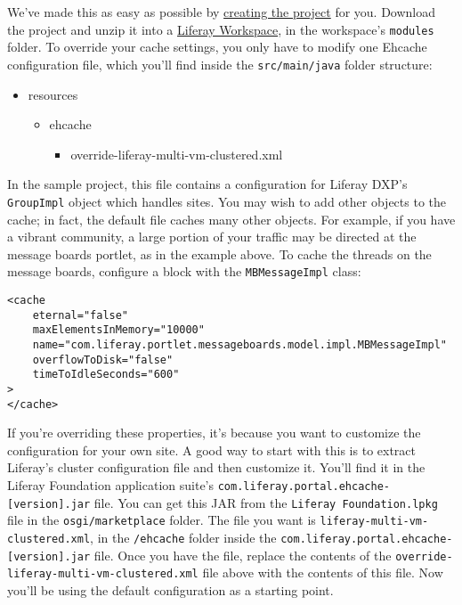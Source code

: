 We've made this as easy as possible by
\href{https://portal.liferay.dev/documents/113763090/114000186/portal-cache-override-config.zip}{creating
the project} for you. Download the project and unzip it into a
\href{/docs/7-0/tutorials/-/knowledge_base/t/liferay-workspace}{Liferay
Workspace}, in the workspace's \texttt{modules} folder. To override your
cache settings, you only have to modify one Ehcache configuration file,
which you'll find inside the \texttt{src/main/java} folder structure:

\begin{itemize}
\tightlist
\item
   resources

  \begin{itemize}
  \tightlist
  \item
    ehcache

    \begin{itemize}
    \tightlist
    \item
      override-liferay-multi-vm-clustered.xml
    \end{itemize}
  \end{itemize}
\end{itemize}

In the sample project, this file contains a configuration for Liferay
DXP's \texttt{GroupImpl} object which handles sites. You may wish to add
other objects to the cache; in fact, the default file caches many other
objects. For example, if you have a vibrant community, a large portion
of your traffic may be directed at the message boards portlet, as in the
example above. To cache the threads on the message boards, configure a
block with the \texttt{MBMessageImpl} class:

\begin{verbatim}
<cache
    eternal="false"
    maxElementsInMemory="10000"
    name="com.liferay.portlet.messageboards.model.impl.MBMessageImpl"
    overflowToDisk="false"
    timeToIdleSeconds="600"
>
</cache>
\end{verbatim}

If you're overriding these properties, it's because you want to
customize the configuration for your own site. A good way to start with
this is to extract Liferay's cluster configuration file and then
customize it. You'll find it in the Liferay Foundation application
suite's \texttt{com.liferay.portal.ehcache-{[}version{]}.jar} file. You
can get this JAR from the \texttt{Liferay\ Foundation.lpkg} file in the
\texttt{osgi/marketplace} folder. The file you want is
\texttt{liferay-multi-vm-clustered.xml}, in the \texttt{/ehcache} folder
inside the \texttt{com.liferay.portal.ehcache-{[}version{]}.jar} file.
Once you have the file, replace the contents of the
\texttt{override-liferay-multi-vm-clustered.xml} file above with the
contents of this file. Now you'll be using the default configuration as
a starting point.

